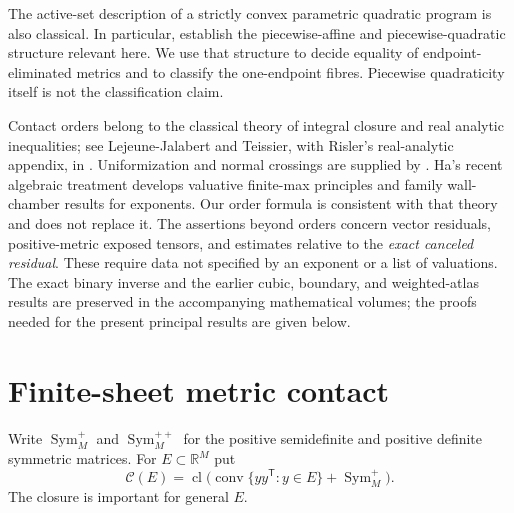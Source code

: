 \documentclass[11pt,reqno]{amsart}
\numberwithin{equation}{section}
\theoremstyle{definition}
\theoremstyle{remark}
\newcommand{\R}{\mathbb R}
\newcommand{\Sym}{\operatorname{Sym}}
\newcommand{\cl}{\operatorname{cl}}
\newcommand{\cC}{\mathcal C}
\begin{document}
The active-set description of a strictly convex parametric quadratic program is also classical. In particular, \cite[Theorem 4 and Corollary 1]{BMDP} establish the piecewise-affine and piecewise-quadratic structure relevant here. We use that structure to decide equality of endpoint-eliminated metrics and to classify the one-endpoint fibres. Piecewise quadraticity itself is not the classification claim.

Contact orders belong to the classical theory of integral closure and real analytic inequalities; see Lejeune-Jalabert and Teissier, with Risler's real-analytic appendix, in \cite{LJT}. Uniformization and normal crossings are supplied by \cite[Theorem 0.1 and Corollary 4.9]{BM}. Ha's recent algebraic treatment \cite{Ha} develops valuative finite-max principles and family wall-chamber results for exponents. Our order formula is consistent with that theory and does not replace it. The assertions beyond orders concern vector residuals, positive-metric exposed tensors, and estimates relative to the \emph{exact canceled residual}. These require data not specified by an exponent or a list of valuations. The exact binary inverse and the earlier cubic, boundary, and weighted-atlas results are preserved in the accompanying mathematical volumes; the proofs needed for the present principal results are given below.

\section{Finite-sheet metric contact}\label{sec:envelope}
Write $\Sym_M^+$ and $\Sym_M^{++}$ for the positive semidefinite and positive definite symmetric matrices. For $E\subset\R^M$ put
\begin{equation}\label{eq:envelope}
 \cC(E)=\cl\bigl(\operatorname{conv}\{yy^{\mathsf T}:y\in E\}+\Sym_M^+\bigr).
\end{equation}
The closure is important for general $E$.
\end{document}
